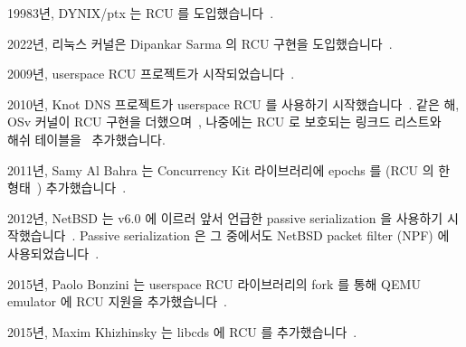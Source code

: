 19983년, DYNIX/ptx 는 RCU 를 도입했습니다~\cite{McKenney98,Slingwine95}.

2022년, 리눅스 커널은 Dipankar Sarma 의 RCU 구현을
도입했습니다~\cite{Torvalds2.5.43}.

2009년, userspace RCU 프로젝트가
시작되었습니다~\cite{MathieuDesnoyers2009URCU}.

2010년, Knot DNS 프로젝트가 userspace RCU 를 사용하기
시작했습니다~\cite{LubosSlovak2010KnotDNSRCU}.
같은 해, OSv 커널이 RCU 구현을 더했으며~\cite{AviKivity2013OSvRCU}, 나중에는
RCU 로 보호되는 링크드 리스트와~\cite{AviKivity2013OSvRCUlist} 해쉬
테이블을~\cite{AviKivity2013OSvRCUhash} 추가했습니다.

2011년, Samy Al Bahra 는 Concurrency Kit 라이브러리에 epochs 를 (RCU 의 한
형태~\cite{UACM-CL-TR-579,KeirFraser2007withoutLocks})
추가했습니다~\cite{SamyAlBahra2011ckEpoch}.

\iffalse

IBM's VM/XA is adopted passive serialization, a mechanism similar to
RCU, some time in the 1980s~\cite{Hennessy89}.

DYNIX/ptx adopted RCU in 1993~\cite{McKenney98,Slingwine95}.

The Linux kernel adopted Dipankar Sarma's implementation of RCU in
2002~\cite{Torvalds2.5.43}.

The userspace RCU project started in 2009~\cite{MathieuDesnoyers2009URCU}.

The Knot DNS project started using the userspace RCU
library in 2010~\cite{LubosSlovak2010KnotDNSRCU}.
That same year, the OSv kernel added an RCU
implementation~\cite{AviKivity2013OSvRCU},
later adding an RCU-protected linked list~\cite{AviKivity2013OSvRCUlist}
and an RCU-protected hash table~\cite{AviKivity2013OSvRCUhash}.

In 2011, Samy Al Bahra added epochs
(a form of RCU~\cite{UCAM-CL-TR-579,KeirFraser2007withoutLocks})
to the Concurrency Kit
library~\cite{SamyAlBahra2011ckEpoch}.

\fi

2012년, NetBSD 는 v6.0 에 이르러 앞서 언급한 passive serialization 을 사용하기
시작했습니다~\cite{NetBSD2012pserialize}.
Passive serialization 은 그 중에서도 NetBSD packet filter (NPF) 에
사용되었습니다~\cite{MindaugasRasiukevicius2014NPFRCU}.

2015년, Paolo Bonzini 는 userspace RCU 라이브러리의 fork 를 통해 QEMU emulator
에 RCU 지원을 추가했습니다~\cite{MikeDay2013RCUqemu,PaoloBonzini2013QEMURCU}.

2015년, Maxim Khizhinsky 는 libcds 에 RCU 를
추가했습니다~\cite{MaxKhiszinsky2015C++RCU}.


